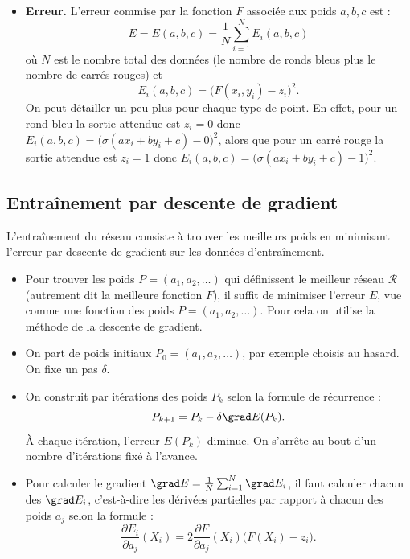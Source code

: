 \begin{exemple}{}{}
\begin{itemize}
		\item \textbf{Erreur.} L'erreur commise par la fonction $F$ associée aux poids $a,b,c$ est :
		$$E = E(a,b,c) = \frac{1}{N} \sum_{i=1}^N E_i(a,b,c)$$
		où $N$ est le nombre total des données (le nombre de ronds bleus plus le nombre de carrés rouges)
		et 
		$$E_i(a,b,c) = \big( F(x_i,y_i) - z_i \big)^2.$$
		On peut détailler un peu plus pour chaque type de point.
		En effet, pour un rond bleu la sortie attendue est $z_i=0$ donc $E_i(a,b,c) = \big( \sigma(a x_i + b y_i + c) - 0 \big)^2$, alors que pour un carré rouge la sortie attendue est $z_i=1$ donc $E_i(a,b,c) = \big( \sigma(a x_i + b y_i + c) - 1 \big)^2$.
		
	\end{itemize}
\end{exemple}


\subsection{Entraînement par descente de gradient}

L'entraînement du réseau consiste à trouver les meilleurs poids en minimisant l'erreur par descente de gradient sur les données d'entraînement.

\begin{itemize}
	\item Pour trouver les poids $P = (a_1,a_2,\ldots)$ qui définissent le meilleur réseau $\mathcal{R}$ (autrement dit la meilleure fonction $F$),
	il suffit de minimiser l'erreur $E$, vue comme une fonction des poids $P = (a_1,a_2,\ldots)$. Pour cela on utilise la méthode de la descente de gradient.
	
	\item On part de poids initiaux $P_0 = (a_1,a_2,\ldots)$, par exemple choisis au hasard. On fixe un pas $\delta$.
	
	\item On construit par itérations des poids $P_k$ selon la formule de récurrence :
	$$P_{k+1} = P_k - \delta \grad E(P_k).$$
	\`A chaque itération, l'erreur $E(P_k)$ diminue.
	On s'arrête au bout d'un nombre d'itérations fixé à l'avance.
	
	\item Pour calculer le gradient $\grad E = \frac{1}{N} \sum_{i=1}^N \grad E_i$, il faut  
	calculer chacun des $\grad E_i$, c'est-à-dire les dérivées partielles par rapport à chacun des poids $a_j$ selon la formule :
	$$\frac{\partial E_i}{\partial a_j}(X_i) = 2 \frac{\partial F}{\partial a_j}(X_i)  \big( F(X_i) - z_i \big).$$
\end{itemize}  


